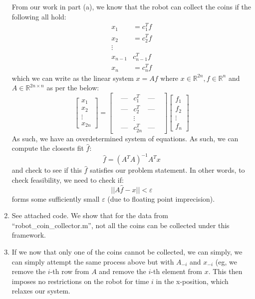 \documentclass[12pt]{exam}
\newcommand*{\eps}{\varepsilon}  %
\begin{document}
\begin{questions}
\begin{solution}
\begin{enumerate}[label=(\alph*)]
        From our work in part (a), we know that the robot can collect the coins if the following all hold:
        \begin{align*}
          x_1 &= c_1^T f \\
          x_2 & = c_2^T f \\
          \vdots \\
          x_{n-1} & c_{n-1}^T f \\
          x_n &= c_n^T f
        \end{align*}
        which we can write as the linear system $x = Af$ where $x \in \mathbb{R}^{2n}, f \in \mathbb{R}^n$ and $A \in \mathbb{R}^{2n \times n}$ as per the below:
        \[
          \begin{bmatrix}
            x_1 \\
            x_2 \\
            \vdots \\
            x_{2n}
          \end{bmatrix} =
          \begin{bmatrix}
            & \text{---} & c_1^T &\text{---}  & \\
            &\text{---} & c_2^T &\text{---}  & \\
            & & \vdots & & \\
            &\text{---} & c_{2n}^T &\text{---}  &
          \end{bmatrix}
          \begin{bmatrix}
            f_1 \\
            f_2 \\
            \vdots \\
            f_n
          \end{bmatrix}
        \]
        As such, we have an overdetermined system of equations. As such, we can compute the closests fit $\hat{f}$:
        \[
          \hat{f} = (A^TA)^{-1}A^Tx
        \]
        and check to see if this $\hat{f}$ satisfies our problem statement. In other words, to check feasibility, we need to check if:
        \[
          || A\hat{f} - x|| < \eps
        \]
        forms some sufficiently small $\eps$ (due to floating point imprecision).
      
      \item See attached code. We show that for the data from ``robot\_coin\_collector.m'', not all the coins can be collected under this framework.
      
      \item If we now that only one of the coins cannot be collected, we can simply, we can simply attempt the same process above but with $A_{-i}$ and $x_{-i}$ (eg, we remove the $i$-th row from $A$ and remove the $i$-th element from $x$. This then imposes no restrictions on the robot for time $i$ in the x-position, which relaxes our system.


\end{enumerate}
\end{solution}
\end{questions}
\end{document}
